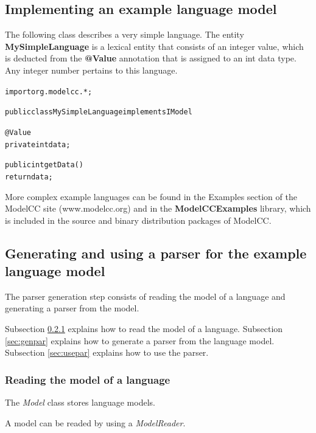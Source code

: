 \documentclass[a4paper,twoside,onecolumn]{article}
\newenvironment{colframe}{%
  \begin{Sbox} 
    \begin{minipage}{.8\columnwidth} 
}{%

  \end{minipage} 
  \end{Sbox} 
  \begin{center} 
    \fcolorbox{black}{MyGray}{\TheSbox} 
  \end{center} 
}
\begin{document}
\subsection{Implementing an example language model} \label{sec:lang}

The following class describes a very simple language. The entity {\bf MySimpleLanguage} is a lexical entity that consists of an integer value, which is deducted from the {\bf @Value} annotation that is assigned to an int data type. Any integer number pertains to this language.

\begin{colframe}
\begin{alltt}
import org.modelcc.*;

public class MySimpleLanguage implements IModel {

    @Value
    private int data;    
    
    public int getData() {
        return data;
    }

}
\end{alltt}
\end{colframe}

More complex example languages can be found in the Examples section of the ModelCC site (www.modelcc.org) and in the {\bf ModelCCExamples} library, which is included in the source and binary distribution packages of ModelCC.

\subsection{Generating and using a parser for the example language model} \label{sec:generating}

The parser generation step consists of reading the model of a language and generating a parser from the model.

Subsection \ref{sec:reading} explains how to read the model of a language.
Subsection \ref{sec:genpar} explains how to generate a parser from the language model.
Subsection \ref{sec:usepar} explains how to use the parser.

\subsubsection{Reading the model of a language} \label{sec:reading}

The \emph{Model} class stores language models.

A model can be readed by using a \emph{ModelReader}.
\end{document}
